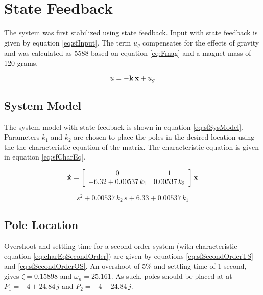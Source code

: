\section{State Feedback}

The system was first stabilized using state feedback.
Input with state feedback is given by equation \ref{eq:sfInput}.
The term $u_g$ compensates for the effects of gravity and was calculated as 5588 based on equation \ref{eq:Fmag} and a magnet mass of 120 grams.

\begin{equation}
	\label{eq:sfInput}
	u = -{\bf k\,x} + u_g
\end{equation}

\subsection{System Model}

The system model with state feedback is shown in equation \ref{eq:sfSysModel}.
Parameters $k_1$ and $k_2$ are chosen to place the poles in the desired location using the the characteristic equation of the matrix.
The characteristic equation is given in equation \ref{eq:sfCharEq}.

\begin{equation}
	\label{eq:sfSysModel}
	{\bf \dot{x}} = 
	\left[
		\begin{array}{cc}
			 0 & 1 \\
			-6.32+0.00537\,k_1 & 0.00537\,k_2  \\
		\end{array}
	\right]
		{\bf x}
\end{equation}

\begin{equation}
	\label{eq:sfCharEq}
	s^2 + 0.00537\,k_2\,s + 6.33+0.00537\,k_1
\end{equation}

\subsection{Pole Location}

Overshoot and settling time for a second order system (with characteristic equation \ref{eq:charEqSecondOrder}) are given by equations \ref{eq:sfSecondOrderTS} and \ref{eq:sfSecondOrderOS}.
An overshoot of 5\% and settling time of 1 second, gives $\zeta =0.15898$ and $\omega_n = 25.161$.
As such, poles should be placed at at $P_1 = -4 +24.84\,j$ and $P_2 = -4 - 24.84\,j$.

